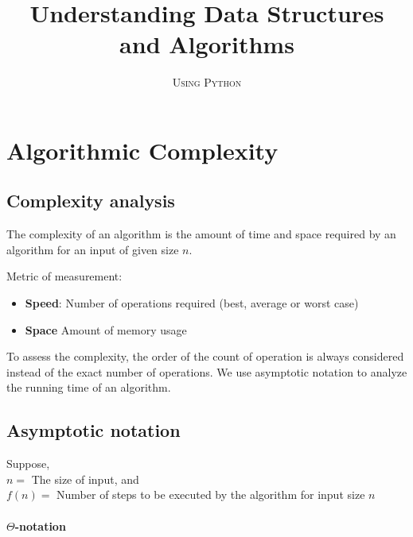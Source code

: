 \documentclass[a4paper,11pt]{book}
\title{\Huge \textbf{Understanding Data Structures and Algorithms}
}
\author{\textsc{Using Python}
}
\begin{document}
\frontmatter
\maketitle

\tableofcontents
\newpage

\mainmatter

\chapter{Algorithmic Complexity}

\section{Complexity analysis}

The complexity of an algorithm is the amount of time and space required by an algorithm for an input of given size $n$.
\vspace{3mm}

\noindent Metric of measurement:
\begin{itemize}
    \item \textbf{Speed}: Number of operations required (best, average or worst case)
    \item \textbf{Space} Amount of memory usage
\end{itemize}

\noindent To assess the complexity, the order of the count of operation is always considered instead of the exact number of operations. We use asymptotic notation to analyze the running time of an algorithm.

\section{Asymptotic notation}

Suppose,\\
$n = $ The size of input, and \\
$f(n) = $ Number of steps to be executed by the algorithm for input size $n$

\subsubsection{$\Theta$-notation}
\end{document}
